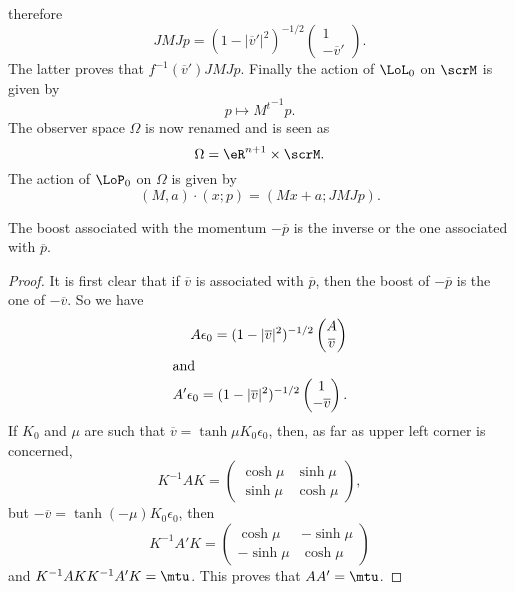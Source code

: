 therefore
\begin{equation}
 JMJp=(1-|\overline{v}'|^2)^{-1/2}
\begin{pmatrix}
1\\-\overline{v}'
\end{pmatrix}.
\end{equation}
The latter proves that $f^{-1}(\overline{v}')JMJp$. Finally the action of $\LoL_0$ on $\scrM$ is given by
\[
  p\mapsto {M^{t}}^{-1} p.
\]
The observer space $\Omega$ is now renamed  and is seen as
\begin{equation}
\Omega=\eR^{n+1}\times\scrM.
\end{equation}
The action of $\LoP_0$ on $\Omega$ is given by
\begin{equation} \label{eq_Maxp}
(M,a)\cdot(x;p)=(Mx+a;JMJp).
\end{equation}


\begin{lemma} \label{lem_boost_inverse}
The boost associated with the momentum $-\overline{p}$ is the inverse or the one associated with $\overline{p}$.
\end{lemma}


\begin{proof}
It is first clear that if $\overline{v}$ is associated with $\overline{p}$, then the boost of $-\overline{p}$ is the one of $-\overline{v}$. So we have
\begin{subequations}
\begin{align}
  A\epsilon_0=(1-|\overline{v}|^2)^{-1/2}
\begin{pmatrix}
A\\\overline{v}
\end{pmatrix}\\
\intertext{and}
A'\epsilon_0=(1-|\overline{v}|^2)^{-1/2}
\begin{pmatrix}
1\\-\overline{v}
\end{pmatrix}.
\end{align}
\end{subequations}
If $K_0$ and $\mu$ are such that $\overline{v}=\tanh\mu K_0\epsilon_0$, then, as far as upper left corner is concerned,
\[
  K^{-1}AK=
\begin{pmatrix}
\cosh\mu & \sinh\mu\\
\sinh\mu & \cosh\mu
\end{pmatrix},
\]
but $-\overline{v}=\tanh(-\mu)K_0\epsilon_0$, then
\[
  K^{-1}A'K=
\begin{pmatrix}
\cosh\mu & -\sinh \mu\\
-\sinh\mu & \cosh\mu
\end{pmatrix}
\]
and $K^{-1}AKK^{-1}A'K=\mtu$. This proves that $AA'=\mtu$.
\end{proof}


